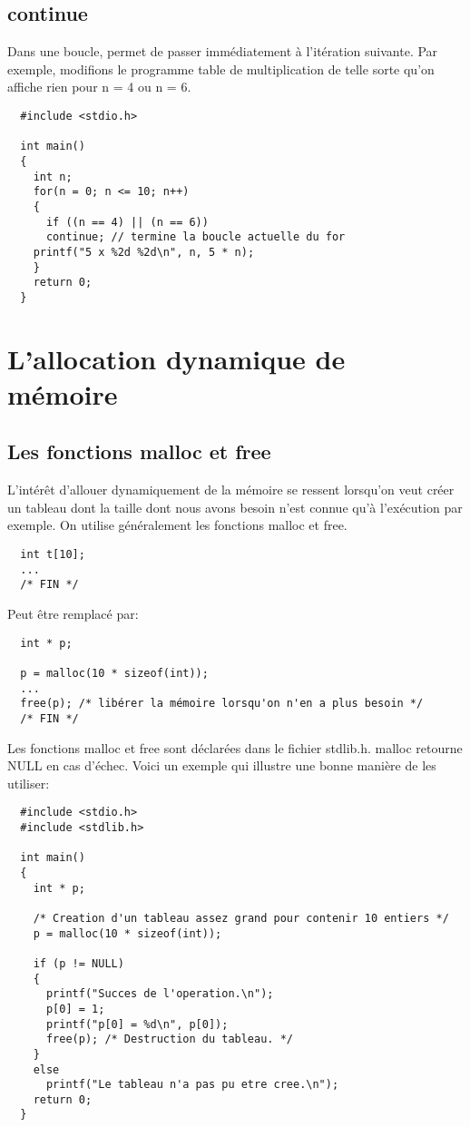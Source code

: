 \documentclass[a4paper]{article}
\begin{document}
\subsection{continue}
Dans une boucle, permet de passer immédiatement à l'itération suivante. Par exemple, modifions le programme table de multiplication de telle sorte qu'on affiche rien pour n = 4 ou n = 6.
\begin{lstlisting}
  #include <stdio.h>
  
  int main()
  {
    int n;
    for(n = 0; n <= 10; n++)
    {
      if ((n == 4) || (n == 6))
      continue; // termine la boucle actuelle du for
    printf("5 x %2d %2d\n", n, 5 * n);
    }
    return 0;
  }
\end{lstlisting}
\section{L'allocation dynamique de mémoire}
\subsection{Les fonctions malloc et free}
L'intérêt d'allouer dynamiquement de la mémoire se ressent lorsqu'on veut créer un tableau dont la taille dont nous avons besoin n'est connue qu'à l'exécution par exemple. On utilise généralement les fonctions malloc et free.
\begin{lstlisting}
  int t[10];
  ...
  /* FIN */
\end{lstlisting}
Peut être remplacé par:
\begin{lstlisting}
  int * p;
  
  p = malloc(10 * sizeof(int));
  ...
  free(p); /* libérer la mémoire lorsqu'on n'en a plus besoin */
  /* FIN */
\end{lstlisting}
Les fonctions malloc et free sont déclarées dans le fichier stdlib.h. malloc retourne NULL en cas d'échec. Voici un exemple qui illustre une bonne manière de les utiliser:
\begin{lstlisting}
  #include <stdio.h>
  #include <stdlib.h>
  
  int main()
  {
    int * p;
    
    /* Creation d'un tableau assez grand pour contenir 10 entiers */
    p = malloc(10 * sizeof(int));
    
    if (p != NULL)
    {
      printf("Succes de l'operation.\n");
      p[0] = 1;
      printf("p[0] = %d\n", p[0]);
      free(p); /* Destruction du tableau. */
    }
    else
      printf("Le tableau n'a pas pu etre cree.\n");
    return 0;
  }
\end{lstlisting}
\end{document}
